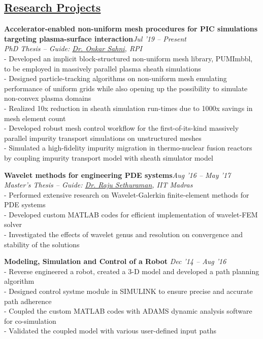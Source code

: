 \documentclass[margin,line]{res}
\begin{document}
\begin{resume}
\section {\sc \href{https://vickyragav95.github.io/research.html}{\color{RoyalPurple}Research Projects}}
\textbullet\hspace{0.005cm} {\bf Accelerator-enabled non-uniform mesh procedures for PIC simulations targeting plasma-surface interaction}\hfill {\em Jul '19 -- Present}\\
{\em PhD Thesis -- Guide: \href {https://homepages.rpi.edu/~sahni/} {\color{RoyalPurple} Dr. Onkar Sahni}, RPI}\\
- Developed an implicit block-structured non-uniform mesh library, PUMImbbl, to be employed in massively parallel plasma sheath simulations \\
- Designed particle-tracking algorithms on non-uniform mesh emulating performance of uniform grids while also opening up the possibility to simulate non-convex plasma domains\\
- Realized 10x reduction in sheath simulation run-times due to 1000x savings in mesh element count\\
- Developed robust mesh control workflow for the first-of-its-kind massively parallel impurity transport simulations on unstructured meshes\\
- Simulated a high-fidelity impurity migration in thermo-nuclear fusion reactors by coupling impurity transport model with sheath simulator model 

\textbullet\hspace{0.005cm} {\bf Wavelet methods for engineering PDE systems}\hfill {\em Aug '16 -- May '17}\\
{\em Master's Thesis -- Guide: \href {https://mech.iitm.ac.in/meiitm/personnal/raju-sethuraman/} {\color{RoyalPurple} Dr. Raju Sethuraman}, IIT Madras}\\
- Performed extensive research on Wavelet-Galerkin finite-element methods for PDE systems\\
- Developed custom MATLAB codes for efficient implementation of wavelet-FEM solver\\
- Investigated the effects of wavelet genus and resolution on convergence and stability of the solutions

\textbullet\hspace{0.005cm} {\bf Modeling, Simulation and Control of a Robot }\hfill {\em Dec '14 -- Aug '16}\\
- Reverse engineered a robot, created a 3-D model and developed a path planning algorithm\\
- Designed control systme module in SIMULINK to ensure precise and accurate path adherence\\
- Coupled the custom MATLAB codes with ADAMS dynamic analysis software for co-simulation\\
- Validated the coupled model with various user-defined input paths


\end{resume}
\end{document}
